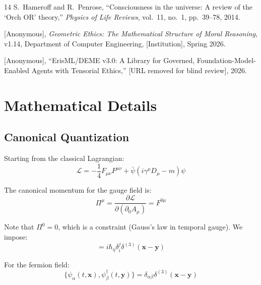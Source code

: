 \documentclass[12pt]{article}
\begin{document}
\begin{thebibliography}{14}
S.~Hameroff and R.~Penrose, ``Consciousness in the universe: A review of the `Orch OR' theory,'' \emph{Physics of Life Reviews}, vol.~11, no.~1, pp.~39--78, 2014.

[Anonymous], \emph{Geometric Ethics: The Mathematical Structure of Moral Reasoning}, v1.14, Department of Computer Engineering, [Institution], Spring 2026.

[Anonymous], ``ErisML/DEME v3.0: A Library for Governed, Foundation-Model-Enabled Agents with Tensorial Ethics,'' [URL removed for blind review], 2026.

\end{thebibliography}

\appendix

\section{Mathematical Details}

\subsection{Canonical Quantization}

Starting from the classical Lagrangian:
\begin{equation}
    \mathcal{L} = -\frac{1}{4} F_{\mu\nu} F^{\mu\nu} + \bar{\psi}(i\gamma^\mu D_\mu - m)\psi
\end{equation}

The canonical momentum for the gauge field is:
\begin{equation}
    \Pi^\mu = \frac{\partial \mathcal{L}}{\partial(\partial_0 A_\mu)} = F^{0\mu}
\end{equation}

Note that $\Pi^0 = 0$, which is a constraint (Gauss's law in temporal gauge). We impose:
\begin{equation}
    [A_i(t, \mathbf{x}), \Pi^j(t, \mathbf{y})] = i\hbar_\eta \delta_i^j \delta^{(3)}(\mathbf{x} - \mathbf{y})
\end{equation}

For the fermion field:
\begin{equation}
    \{\psi_\alpha(t, \mathbf{x}), \psi_\beta^\dagger(t, \mathbf{y})\} = \delta_{\alpha\beta} \delta^{(3)}(\mathbf{x} - \mathbf{y})
\end{equation}
\end{document}

